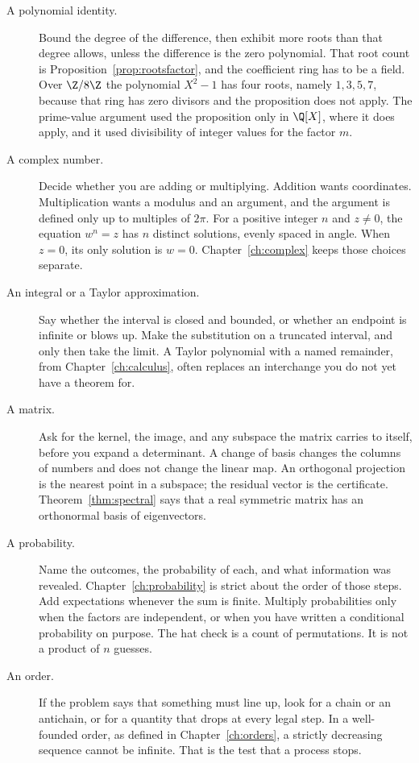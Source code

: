 \begin{description}
\item[A polynomial identity.] Bound the degree of the difference, then exhibit more roots than that degree allows, unless the difference is the zero polynomial. That root count is Proposition~\ref{prop:rootsfactor}, and the coefficient ring has to be a field. Over $\Z/8\Z$ the polynomial $X^2-1$ has four roots, namely $1,3,5,7$, because that ring has zero divisors and the proposition does not apply. The prime-value argument used the proposition only in $\Q[X]$, where it does apply, and it used divisibility of integer values for the factor $m$.
\item[A complex number.] Decide whether you are adding or multiplying. Addition wants coordinates. Multiplication wants a modulus and an argument, and the argument is defined only up to multiples of $2\pi$. For a positive integer $n$ and $z\ne0$, the equation $w^n=z$ has $n$ distinct solutions, evenly spaced in angle. When $z=0$, its only solution is $w=0$. Chapter~\ref{ch:complex} keeps those choices separate.
\item[An integral or a Taylor approximation.] Say whether the interval is closed and bounded, or whether an endpoint is infinite or blows up. Make the substitution on a truncated interval, and only then take the limit. A Taylor polynomial with a named remainder, from Chapter~\ref{ch:calculus}, often replaces an interchange you do not yet have a theorem for.
\item[A matrix.] Ask for the kernel, the image, and any subspace the matrix carries to itself, before you expand a determinant. A change of basis changes the columns of numbers and does not change the linear map. An orthogonal projection is the nearest point in a subspace; the residual vector is the certificate. Theorem~\ref{thm:spectral} says that a real symmetric matrix has an orthonormal basis of eigenvectors.
\item[A probability.] Name the outcomes, the probability of each, and what information was revealed. Chapter~\ref{ch:probability} is strict about the order of those steps. Add expectations whenever the sum is finite. Multiply probabilities only when the factors are independent, or when you have written a conditional probability on purpose. The hat check is a count of permutations. It is not a product of $n$ guesses.
\item[An order.] If the problem says that something must line up, look for a chain or an antichain, or for a quantity that drops at every legal step. In a well-founded order, as defined in Chapter~\ref{ch:orders}, a strictly decreasing sequence cannot be infinite. That is the test that a process stops.
\end{description}

